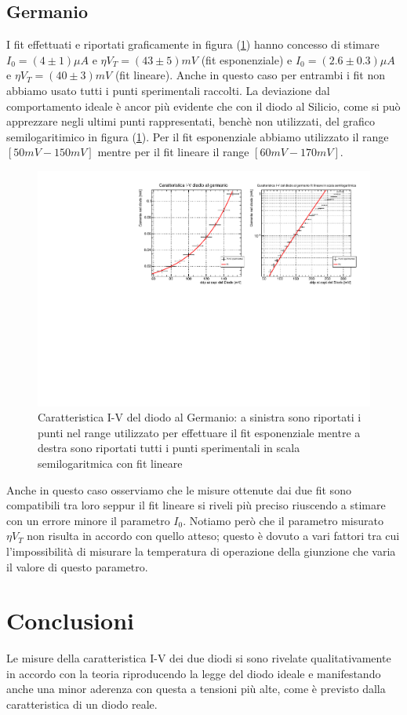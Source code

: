 \documentclass[]{article}
\begin{document}
\subsection{Germanio}
I fit effettuati e riportati graficamente in figura (\ref{fig:germanio}) hanno concesso di stimare $I_0=(4\pm1)\mu A$ e $\eta V_T=(43\pm5)mV$ (fit esponenziale) e $I_0=(2.6\pm0.3)\mu A$ e $\eta V_T=(40\pm3)mV$ (fit lineare). Anche in questo caso per entrambi i fit non abbiamo usato tutti i punti sperimentali raccolti. La deviazione dal comportamento ideale è ancor più evidente che con il diodo al Silicio, come si può apprezzare negli ultimi punti rappresentati, benchè non utilizzati, del grafico semilogaritimico in figura (\ref{fig:germanio}).
Per il fit esponenziale abbiamo utilizzato il range $[50mV-150mV]$ mentre per il fit lineare il range $[60mV-170mV]$.
\begin{figure}[H]
	\centering
	\includegraphics[width=0.8\linewidth]{../Germanio/canvas}
	\caption{Caratteristica I-V del diodo al Germanio: a sinistra sono riportati i punti nel range utilizzato per effettuare il fit esponenziale mentre a destra sono riportati tutti i punti sperimentali in scala semilogaritmica con fit lineare}
	\label{fig:germanio}
\end{figure}
Anche in questo caso osserviamo che le misure ottenute dai due fit sono compatibili tra loro seppur il fit lineare si riveli più preciso riuscendo a stimare con un errore minore il parametro $I_0$.
Notiamo però che il parametro misurato $\eta V_T$ non risulta in accordo con quello atteso; questo è dovuto a vari fattori tra cui l'impossibilità di misurare la temperatura di operazione della giunzione che varia il valore di questo parametro.
\section*{Conclusioni}
Le misure della caratteristica I-V dei due diodi si sono rivelate qualitativamente in accordo con la teoria riproducendo la legge del diodo ideale e manifestando anche una minor aderenza con questa a tensioni più alte, come è previsto dalla caratteristica di un diodo reale. 
\end{document}
